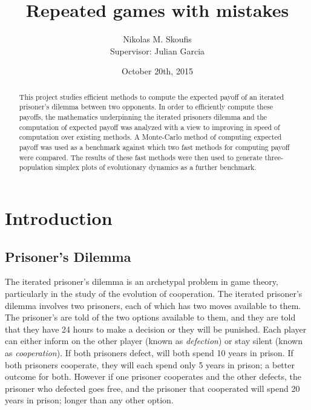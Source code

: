 \documentclass[a4paper,12pt]{article}
\begin{document}
\title{Repeated games with mistakes}
\author{Nikolas M. Skoufis \\ Supervisor: Julian Garcia}
\date{October 20th, 2015}

\maketitle

\begin{abstract}

This project studies efficient methods to compute the expected payoff of an iterated prisoner's dilemma between two opponents.
In order to efficiently compute these payoffs, the mathematics underpinning the iterated prisoners dilemma and the computation of expected payoff was analyzed with a view to improving in speed of computation over existing methods.
A Monte-Carlo method of computing expected payoff was used as a benchmark against which two fast methods for computing payoff were compared.
The results of these fast methods were then used to generate three-population simplex plots of evolutionary dynamics as a further benchmark.

\end{abstract}

\section{Introduction}

\subsection{Prisoner's Dilemma}

The iterated prisoner's dilemma is an archetypal problem in game theory, particularly in the study of the evolution of cooperation.
The iterated prisoner's dilemma involves two prisoners, each of which has two moves available to them.
The prisoner's are told of the two options available to them, and they are told that they have 24 hours to make a decision or they will be punished.
Each player can either inform on the other player (known as \textit{defection}) or stay silent (known as \textit{cooperation}).
If both prisoners defect, will both spend 10 years in prison.
If both prisoners cooperate, they will each spend only 5 years in prison; a better outcome for both.
However if one prisoner cooperates and the other defects, the prisoner who defected goes free, and the prisoner that cooperated will spend 20 years in prison; longer than any other option.
\end{document}
